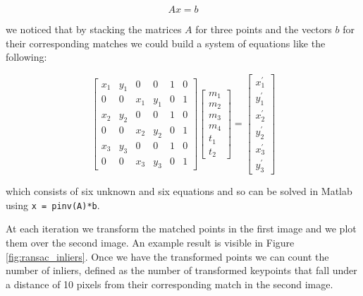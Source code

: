 \documentclass[11pt]{article}
\begin{document}
\begin{equation} \label{eq:transform_eq}
	A x = b
\end{equation}

we noticed that by stacking the matrices $A$ for three points and the vectors
$b$ for their corresponding matches we could build a system of equations like
the following:

\begin{equation} \label{eq:affine_system}
	\begin{bmatrix}
		x_1 & y_1 & 0 & 0 & 1 & 0  \\
		0 & 0 & x_1 & y_1 & 0 & 1  \\
		x_2 & y_2 & 0 & 0 & 1 & 0  \\
		0 & 0 & x_2 & y_2 & 0 & 1  \\
		x_3 & y_3 & 0 & 0 & 1 & 0  \\
		0 & 0 & x_3 & y_3 & 0 & 1 
	\end{bmatrix}
	\begin{bmatrix}
		m_1 \\ m_2 \\ m_3 \\ m_4 \\ t_1 \\ t_2
	\end{bmatrix}
	=
	\begin{bmatrix}
		x^{\prime}_1 \\ y^{\prime}_1 \\ x^{\prime}_2 \\
		y^{\prime}_2 \\ x^{\prime}_3 \\ y^{\prime}_3
	\end{bmatrix}
\end{equation}

which consists of six unknown and six equations and so can be solved in Matlab
using \texttt{x = pinv(A)*b}.

At each iteration we transform the matched points in the first image and we plot
them over the second image. An example result is visible in Figure
\ref{fig:ransac_inliers}. Once we have the transformed points we can count the number of inliers,
defined as the number of transformed keypoints that fall under a distance of
10 pixels from their corresponding match in the second image.
\end{document}
